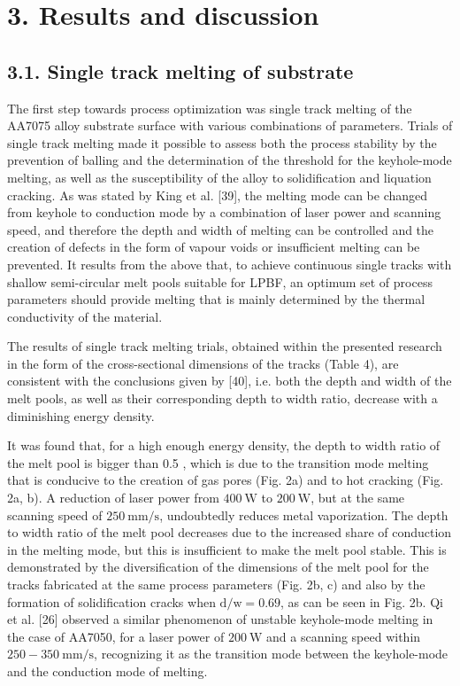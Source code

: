 \documentclass[10pt]{article}
\begin{document}
\section*{3. Results and discussion}
\subsection*{3.1. Single track melting of substrate}
The first step towards process optimization was single track melting of the AA7075 alloy substrate surface with various combinations of parameters. Trials of single track melting made it possible to assess both the process stability by the prevention of balling and the determination of the threshold for the keyhole-mode melting, as well as the susceptibility of the alloy to solidification and liquation cracking. As was stated by King et al. [39], the melting mode can be changed from keyhole to conduction mode by a combination of laser power and scanning speed, and therefore the depth and width of melting can be controlled and the creation of defects in the form of vapour voids or insufficient melting can be prevented. It results from the above that, to achieve continuous single tracks with shallow semi-circular melt pools suitable for LPBF, an optimum set of process parameters should provide melting that is mainly determined by the thermal conductivity of the material.

The results of single track melting trials, obtained within the presented research in the form of the cross-sectional dimensions of the tracks (Table 4), are consistent with the conclusions given by [40], i.e. both the depth and width of the melt pools, as well as their corresponding depth to width ratio, decrease with a diminishing energy density.

It was found that, for a high enough energy density, the depth to width ratio of the melt pool is bigger than 0.5 , which is due to the transition mode melting that is conducive to the creation of gas pores (Fig. 2a) and to hot cracking (Fig. 2a, b). A reduction of laser power from $400 \mathrm{~W}$ to $200 \mathrm{~W}$, but at the same scanning speed of $250 \mathrm{~mm} / \mathrm{s}$, undoubtedly reduces metal vaporization. The depth to width ratio of the melt pool decreases due to the increased share of conduction in the melting mode, but this is insufficient to make the melt pool stable. This is demonstrated by the diversification of the dimensions of the melt pool for the tracks fabricated at the same process parameters (Fig. 2b, c) and also by the formation of solidification cracks when $\mathrm{d} / \mathrm{w}=0.69$, as can be seen in Fig. 2b. Qi et al. [26] observed a similar phenomenon of unstable keyhole-mode melting in the case of AA7050, for a laser power of $200 \mathrm{~W}$ and a scanning speed within $250-350 \mathrm{~mm} / \mathrm{s}$, recognizing it as the transition mode between the keyhole-mode and the conduction mode of melting.
\end{document}
